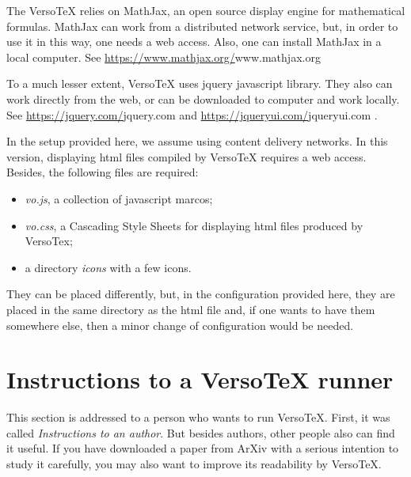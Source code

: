 \documentclass{article}
\begin{document}
The VersoTeX relies on MathJax, an open source display engine for
mathematical formulas. MathJax can work from a distributed network service, 
but, in order to use it in this way, one needs a web access. Also, one can
install MathJax in a local computer. See 
\url{https://www.mathjax.org/}{www.mathjax.org}

To a much lesser extent, VersoTeX uses jquery javascript library. They
also can work directly from the web, or can be downloaded to computer 
and work locally. See \url{https://jquery.com/}{jquery.com} and 
\url{https://jqueryui.com/}{jqueryui.com} .

In the setup provided here, we assume using content delivery networks.
In this version, displaying html files compiled by 
VersoTeX requires a web access.  
Besides, the following files are required:  
\begin{itemize} 
\item {\em vo.js}, a collection of javascript marcos;
\item {\em vo.css}, a Cascading Style Sheets for displaying html files produced
by VersoTex;
\item a directory {\em icons} with a few icons. 
\end{itemize}

They can be placed differently, but, in the configuration provided here, they
are placed in the same directory as the html file and, if one wants to have
them somewhere else, then a minor change of configuration would be needed.


\section{Instructions to a VersoTeX runner}\label{s2}
This section is addressed to a person who wants to run VersoTeX.
First, it was called {\em Instructions to an author}. But besides
authors, other people also can find it useful. 
If you have downloaded a paper from ArXiv with a serious 
intention to study it carefully, you may also want to improve 
its readability by VersoTeX.   
\end{document}
